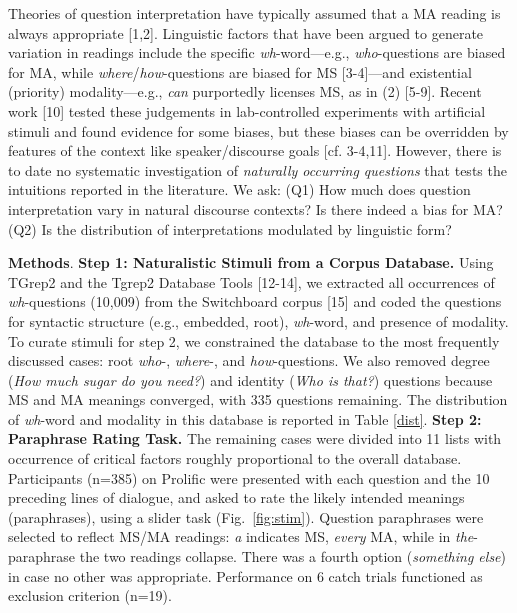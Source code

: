 \vspace{-.1cm}
Theories of question interpretation have typically assumed that a MA reading is always appropriate [1,2]. Linguistic factors that have been argued to generate variation in readings include the specific \emph{wh}-word---e.g., \emph{who}-questions are biased for MA, while \emph{where}/\emph{how}-questions are biased for MS [3-4]---and existential (priority) modality---e.g., \emph{can} purportedly licenses MS, as in (2) [5-9]. Recent work [10] tested these judgements in lab-controlled experiments with artificial stimuli and found evidence for some biases, but these biases can be overridden by features of the context like speaker/discourse goals [cf. 3-4,11]. However, there is to date no systematic investigation of \emph{naturally occurring questions} that tests the intuitions reported in the literature.  We ask: (Q1) How much does question interpretation vary in natural discourse contexts? Is there indeed a bias for MA? (Q2) Is the distribution of interpretations modulated by linguistic form? %

\textbf{Methods}.  \textbf{Step 1: Naturalistic Stimuli from a Corpus Database.}
Using TGrep2 and the Tgrep2 Database Tools [12-14], we extracted all occurrences of \emph{wh}-questions (10,009) from the Switchboard corpus [15] and coded the questions for syntactic structure (e.g., embedded, root), \emph{wh}-word, and presence of modality. To curate stimuli for step 2, we constrained the database to the most frequently discussed cases: root \emph{who}-, \emph{where}-, and \emph{how}-questions. We also removed degree (\emph{How much sugar do you need?}) and identity (\emph{Who is that?}) questions because MS and MA meanings converged, with 335 questions remaining. The distribution of \emph{wh}-word and modality in this database is reported in Table \ref{dist}.  \textbf{Step 2: Paraphrase Rating Task.} The remaining cases were divided into 11 lists with occurrence of critical factors roughly proportional to the overall database. Participants (n=385) on Prolific were presented with each question and the 10 preceding lines of dialogue, and asked to rate the likely intended meanings (paraphrases), using a slider task (Fig.~\ref{fig:stim}). Question paraphrases were selected to reflect MS/MA readings: \emph{a} indicates MS, \emph{every} MA, while in \emph{the}-paraphrase the two readings collapse. There was a fourth option (\emph{something else}) in case no other was appropriate. Performance on 6 catch trials functioned as exclusion criterion (n=19).

